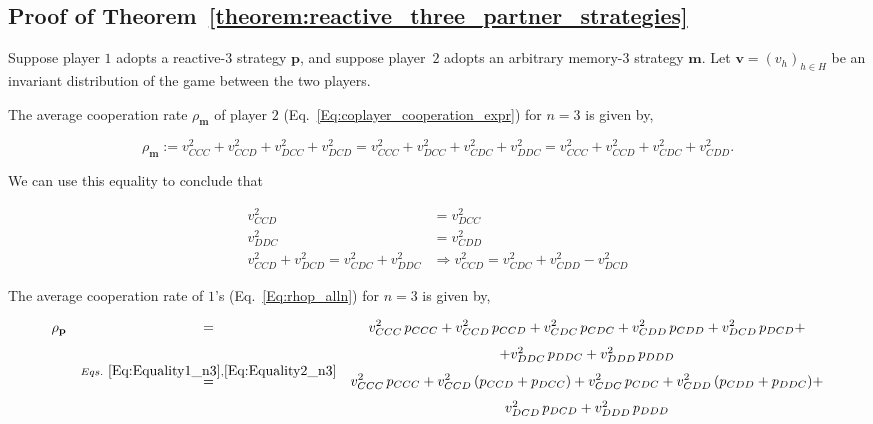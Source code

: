 \documentclass[11pt]{article}
\theoremstyle{plainCl1}
\theoremstyle{plainCl2}
\begin{document}

\subsection{Proof of Theorem~\ref{theorem:reactive_three_partner_strategies}}\label{appendix:reactive_three_akin_generalized}

Suppose player $1$ adopts a reactive-3 strategy $\mathbf{p}$, and suppose
player~$2$ adopts an arbitrary memory-3 strategy $\mathbf{m}$. Let
$\mathbf{v}=(v_h)_{h\in H}$ be an invariant distribution of the game between the
two players.

The average cooperation rate $\rho_\mathbf{m}$ of player $2$
(Eq.~\ref{Eq:coplayer_cooperation_expr}) for $n=3$ is given by,

\begin{equation} \label{Eq:rhoq_n3}
\rho_\mathbf{m} := v^2_{CCC} + v^2_{CCD} + v^2_{DCC} + v^2_{DCD} = v^2_{CCC} + v^2_{DCC} + v^2_{CDC} + v^2_{DDC} = v^2_{CCC} + v^2_{CCD} + v^2_{CDC} + v^2_{CDD}.
\end{equation}

We can use this equality to conclude that

\begin{align} 
  v^{2}_{CCD} & = v^{2}_{DCC} \label{Eq:Equality1_n3} \\ 
  v^{2}_{DDC} & = v^{2}_{CDD} \label{Eq:Equality2_n3} \\  
  v^{2}_{CCD} + v^{2}_{DCD}  = v^{2}_{CDC} + v^{2}_{DDC} & \Rightarrow 
  v^{2}_{CCD} = v^{2}_{CDC} + v^{2}_{CDD} - v^{2}_{DCD} \label{Eq:Equality3_n3} 
\end{align}

The average cooperation rate of $1$'s (Eq.~\eqref{Eq:rhop_alln}) for $n=3$ is given by,

\begin{equation}\label{Eq:rhop_n3}
  \begin{array}{rcc}
  \rho_\mathbf{p} & = & \displaystyle v^2_{CCC}\, p_{CCC}+ v^2_{CCD}\, p_{CCD} + v^2_{CDC}\, p_{CDC} + v^2_{CDD}\, p_{CDD} + v^2_{DCD}\, p_{DCD} +  \\ [.7em]
  & & + v^2_{DDC}\, p_{DDC} + v^2_{DDD}\, p_{DDD} \\
  & \stackrel{Eqs.~\eqref{Eq:Equality1_n3}, \eqref{Eq:Equality2_n3}}{=} & \displaystyle v^2_{CCC}\, p_{CCC}+ v^2_{CCD}\, (p_{CCD} + p_{DCC}) + v^2_{CDC}\, p_{CDC} + v^2_{CDD}\, (p_{CDD} + p_{DDC}) + \\ [.7em]
  & & v^2_{DCD}\, p_{DCD} + v^2_{DDD}\, p_{DDD}
  \end{array}
\end{equation}
 
\end{document}
